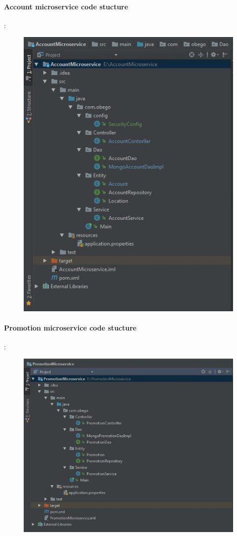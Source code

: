 \paragraph{Account microservice code stucture} :
\begin{figure}[h!]
	\centering
	\includegraphics[height=0.4\textheight]{AccountMicroserviceCodeStructure}
	\label{fig:FilialesEtClients}
\end{figure}

\paragraph{Promotion microservice code stucture} :
\begin{figure}[h!]
	\centering
	\includegraphics[height=0.3\textheight]{PromotionMicroserviceCodeStructure}
	\label{fig:FilialesEtClients}
\end{figure}